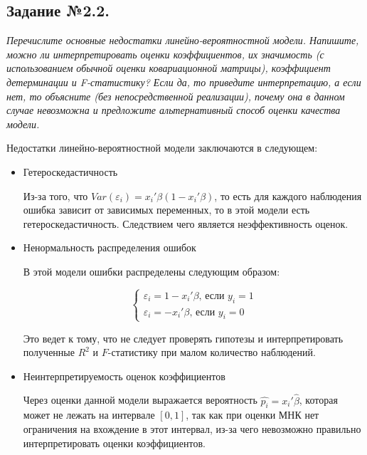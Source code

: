 \documentclass[a4paper,12pt]{article}
\begin{document}
	\subsection{Задание №2.2.}
	
	\textit{
			Перечислите основные недостатки линейно-вероятностной модели. Напишите, можно ли интерпретировать оценки коэффициентов, их значимость (с использованием обычной оценки ковариационной матрицы), коэффициент детерминации и F-статистику?
			Если да, то приведите интерпретацию, а если нет, то объясните (без непосредственной реализации), почему она в данном случае невозможна и предложите альтернативный способ оценки качества модели.
	}
	
	
	\vspace{0.2cm}
	
	Недостатки линейно-вероятностной модели заключаются в следующем:
	
	\begin{itemize}
		\item Гетероскедастичность
		
		Из-за того, что $Var(\varepsilon_i) = x_i'\beta(1-x_i'\beta)$, то есть для каждого наблюдения ошибка зависит от зависимых переменных, то в этой модели есть гетероскедастичность. Следствием чего является неэффективность оценок.
		
		\item Ненормальность распределения ошибок
		
		В этой модели ошибки распределены следующим образом:
		
		\begin{equation*}
			\begin{cases}
				\varepsilon_i = 1-x_i'\beta \text{, если $y_i=1$}\\
				\varepsilon_i = -x_i'\beta \text{, если $y_i=0$}
			\end{cases}
		\end{equation*}
	
		Это ведет к тому, что не следует проверять гипотезы и интерпретировать полученные $R^2$ и $F$-статистику при малом количество наблюдений.
				
		\item Неинтерпретируемость оценок коэффициентов
		
		Через оценки данной модели выражается вероятность $\hat{p_i}=x_i'\hat{\beta}$, которая может не лежать на интервале $[0, 1]$, так как при оценки МНК нет ограничения на вхождение в этот интервал, из-за чего невозможно правильно интерпретировать оценки коэффициентов.
		
	\end{itemize}
	
\end{document}
